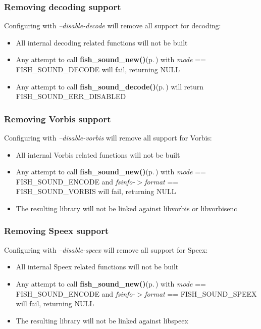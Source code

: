 \subsubsection{Removing decoding support}\label{no_decode}
Configuring with {\em --disable-decode\/} will remove all support for decoding:\begin{itemize}
\item All internal decoding related functions will not be built\item Any attempt to call {\bf fish\_\-sound\_\-new()}{\rm (p.\,\pageref{fishsound_8h_a4})} with {\em mode\/} == FISH\_\-SOUND\_\-DECODE will fail, returning NULL\item Any attempt to call {\bf fish\_\-sound\_\-decode()}{\rm (p.\,\pageref{fishsound_8h_a7})} will return FISH\_\-SOUND\_\-ERR\_\-DISABLED\end{itemize}
\subsubsection{Removing Vorbis support}\label{no_vorbis}
Configuring with {\em --disable-vorbis\/} will remove all support for Vorbis:\begin{itemize}
\item All internal Vorbis related functions will not be built\item Any attempt to call {\bf fish\_\-sound\_\-new()}{\rm (p.\,\pageref{fishsound_8h_a4})} with {\em mode\/} == FISH\_\-SOUND\_\-ENCODE and {\em fsinfo-$>$format\/} == FISH\_\-SOUND\_\-VORBIS will fail, returning NULL\item The resulting library will not be linked against libvorbis or libvorbisenc\end{itemize}
\subsubsection{Removing Speex support}\label{no_speex}
Configuring with {\em --disable-speex\/} will remove all support for Speex:\begin{itemize}
\item All internal Speex related functions will not be built\item Any attempt to call {\bf fish\_\-sound\_\-new()}{\rm (p.\,\pageref{fishsound_8h_a4})} with {\em mode\/} == FISH\_\-SOUND\_\-ENCODE and {\em fsinfo-$>$format\/} == FISH\_\-SOUND\_\-SPEEX will fail, returning NULL\item The resulting library will not be linked against libspeex\end{itemize}
